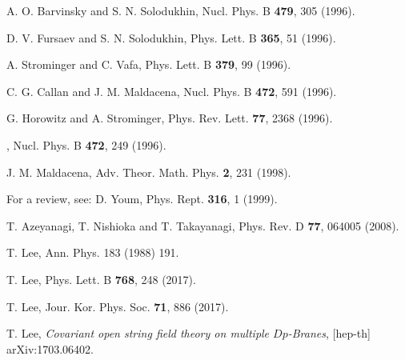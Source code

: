 \documentclass[aps,showpacs,showkeys]{revtex4}
\begin{document}
\begin{thebibliography}{0}
A. O. Barvinsky and S. N. Solodukhin, Nucl. Phys. B {\bf 479}, 305 (1996).

D. V. Fursaev and S. N. Solodukhin, Phys. Lett. B {\bf 365}, 51 (1996).

A. Strominger and C. Vafa, Phys. Lett. B {\bf 379}, 99 (1996).

C. G. Callan and J. M. Maldacena, Nucl. Phys. B {\bf 472}, 591 (1996).

G. Horowitz and A. Strominger, Phys. Rev. Lett. {\bf 77}, 2368 (1996).

, Nucl. Phys. B {\bf 472}, 249 (1996). 

J. M. Maldacena, Adv. Theor. Math. Phys. {\bf 2}, 231 (1998).

For a review, see: 
D. Youm, Phys. Rept. {\bf 316}, 1 (1999). 

T. Azeyanagi, T. Nishioka and T. Takayanagi, Phys. Rev. D {\bf 77}, 064005 (2008).

 T. Lee, Ann. Phys. 183 (1988) 191.

 T. Lee, Phys. Lett. B {\bf 768}, 248 (2017). 

T. Lee, Jour. Kor. Phys. Soc. {\bf 71}, 886 (2017).

T. Lee, {\it Covariant open string field theory on multiple $Dp$-Branes}, [hep-th] arXiv:1703.06402.


\end{thebibliography}
\end{document}
